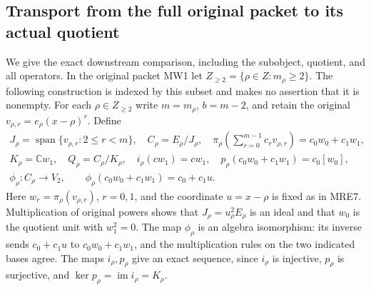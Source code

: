 \subsection{Transport from the full original packet to its actual quotient}

We give the exact downstream comparison, including the subobject,
quotient, and all operators. In the original packet MW1 let
\(Z_{\geq2}=\{\rho\in Z:m_\rho\geq2\}\). The following construction
is indexed by this subset and makes no assertion that it is nonempty.
For each \(\rho\in Z_{\geq2}\) write \(m=m_\rho\), \(b=m-2\), and
retain the original \(v_{\rho,r}=e_\rho(x-\rho)^r\). Define
\[
 \begin{gathered}
 J_\rho=\operatorname{span}\{v_{\rho,r}:2\leq r<m\},\quad
 C_\rho=E_\rho/J_\rho,\quad
 \pi_\rho\left(\sum_{r=0}^{m-1}c_rv_{\rho,r}\right)
                  =c_0w_0+c_1w_1,\\
 K_\rho=\mathbb Cw_1,\quad Q_\rho=C_\rho/K_\rho,\quad
 i_\rho(cw_1)=cw_1,\quad
 p_\rho(c_0w_0+c_1w_1)=c_0[w_0],\\
 \phi_\rho:C_\rho\longrightarrow V_2,\qquad
 \phi_\rho(c_0w_0+c_1w_1)=c_0+c_1u.
 \end{gathered}
 \tag{MRE34}
\]
Here \(w_r=\pi_\rho(v_{\rho,r})\), \(r=0,1\), and the coordinate
\(u=x-\rho\) is fixed as in MRE7. Multiplication of original powers
shows that \(J_\rho=u_\rho^2E_\rho\) is an ideal and that
\(w_0\) is the quotient unit with \(w_1^2=0\). The map
\(\phi_\rho\) is an algebra isomorphism: its inverse sends
\(c_0+c_1u\) to \(c_0w_0+c_1w_1\), and the multiplication rules
on the two indicated bases agree. The maps \(i_\rho,p_\rho\)
give an exact sequence, since \(i_\rho\) is injective,
\(p_\rho\) is surjective, and \(\ker p_\rho=\operatorname{im}i_\rho
=K_\rho\).

